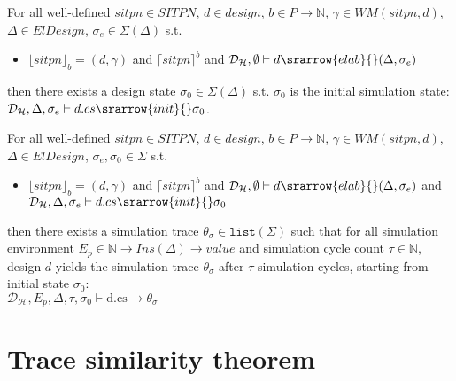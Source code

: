 \documentclass[dvipsnames,12pt]{article}
\begin{document}
\begin{thm}[Initialization]
  \label{thm:init-ex}
  For all well-defined $sitpn\in{}SITPN$, $d\in{}design$,
  $b\in{}P\rightarrow\mathbb{N}$, $\gamma\in{}WM(sitpn,d)$,
  $\Delta\in{}ElDesign$, $\sigma_e\in\Sigma(\Delta)$ s.t.
  \begin{itemize}
  \item $\lfloor{}sitpn\rfloor_b=(d,\gamma)$ and
    $\lceil{}sitpn\rceil^b$ and
    $\mathcal{D}_\mathcal{H},\emptyset\vdash{}d\srarrow{elab}{\fontsize{6}{8}\selectfont}(\Delta,\sigma_{e})$
  \end{itemize}
  \noindent{}then there exists a design state
  $\sigma_0\in\Sigma(\Delta)$ s.t. $\sigma_0$ is the initial
  simulation state:
  $\mathcal{D}_\mathcal{H},\Delta,\sigma_{e}\vdash{}d.cs\srarrow{init}{\fontsize{6}{8}\selectfont}\sigma_0$.
\end{thm}

\begin{thm}
  \label{thm:sim-ex}
  For all well-defined $sitpn\in{}SITPN$, $d\in{}design$,
  $b\in{}P\rightarrow\mathbb{N}$, $\gamma\in{}WM(sitpn,d)$,
  $\Delta\in{}ElDesign$, $\sigma_e,\sigma_0\in\Sigma$ s.t.
  \begin{itemize}
  \item $\lfloor{}sitpn\rfloor_b=(d,\gamma)$ and
    $\lceil{}sitpn\rceil^b$ and
    $\mathcal{D}_\mathcal{H},\emptyset\vdash{}d\srarrow{elab}{\fontsize{6}{8}\selectfont}(\Delta,\sigma_{e})$
    and
    $\mathcal{D}_\mathcal{H},\Delta,\sigma_{e}\vdash{}d.cs\srarrow{init}{\fontsize{6}{8}\selectfont}\sigma_0$
  \end{itemize}
  
  \noindent{}then there exists a simulation trace
  $\theta_\sigma\in\mathtt{list}(\Sigma)$ such that for all simulation
  environment
  $E_p\in{}\mathbb{N}\rightarrow{}Ins(\Delta)\rightarrow{}value$ and
  simulation cycle count $\tau\in\mathbb{N}$, design $d$ yields the
  simulation trace $\theta_\sigma$ after
  $\tau$ simulation cycles, starting from initial state $\sigma_0$:\\
  $\mathcal{D}_\mathcal{H},E_p,\Delta,\tau,\sigma_0\vdash{}\mathrm{d.cs}\rightarrow\theta_\sigma$
\end{thm}

\section{Trace similarity theorem}
\label{sec:trace-sim-thms}
\end{document}
